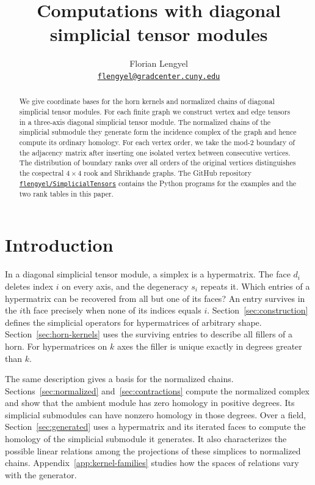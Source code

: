\documentclass[11pt]{article}
\title{Computations with diagonal simplicial tensor modules}
\author{Florian Lengyel\\\small\href{mailto:flengyel@gradcenter.cuny.edu}{\nolinkurl{flengyel@gradcenter.cuny.edu}}}
\date{}
\theoremstyle{definition}
\theoremstyle{remark}
\begin{document}
\maketitle
\begin{abstract}
We give coordinate bases for the horn kernels and normalized chains of diagonal simplicial tensor modules.
For each finite graph we construct vertex and edge tensors in a three-axis diagonal simplicial tensor module.
The normalized chains of the simplicial submodule they generate form the incidence complex of the graph and hence compute its ordinary homology.
For each vertex order, we take the mod-$2$ boundary of the adjacency matrix after inserting one isolated vertex between consecutive vertices.
The distribution of boundary ranks over all orders of the original vertices distinguishes the cospectral $4\times4$ rook and Shrikhande graphs.
The GitHub repository \href{https://github.com/flengyel/SimplicialTensors}{\texttt{flengyel/SimplicialTensors}} contains the Python programs for the examples and the two rank tables in this paper.
\end{abstract}
\setlength{\abovedisplayskip}{6pt plus 2pt minus 3pt}
\setlength{\belowdisplayskip}{6pt plus 2pt minus 3pt}
\setlength{\abovedisplayshortskip}{1pt plus 2pt}
\setlength{\belowdisplayshortskip}{4pt plus 2pt minus 2pt}

\section{Introduction}
In a diagonal simplicial tensor module, a simplex is a hypermatrix.
The face $d_i$ deletes index $i$ on every axis, and the degeneracy $s_i$ repeats it.
Which entries of a hypermatrix can be recovered from all but one of its faces?
An entry survives in the $i$th face precisely when none of its indices equals $i$.
Section~\ref{sec:construction} defines the simplicial operators for hypermatrices of arbitrary shape.
Section~\ref{sec:horn-kernels} uses the surviving entries to describe all fillers of a horn.
For hypermatrices on $k$ axes the filler is unique exactly in degrees greater than $k$.

The same description gives a basis for the normalized chains.
Sections~\ref{sec:normalized} and~\ref{sec:contractions} compute the normalized complex and show that the ambient module has zero homology in positive degrees.
Its simplicial submodules can have nonzero homology in those degrees.
Over a field, Section~\ref{sec:generated} uses a hypermatrix and its iterated faces to compute the homology of the simplicial submodule it generates.
It also characterizes the possible linear relations among the projections of these simplices to normalized chains.
Appendix~\ref{app:kernel-families} studies how the spaces of relations vary with the generator.
\end{document}
